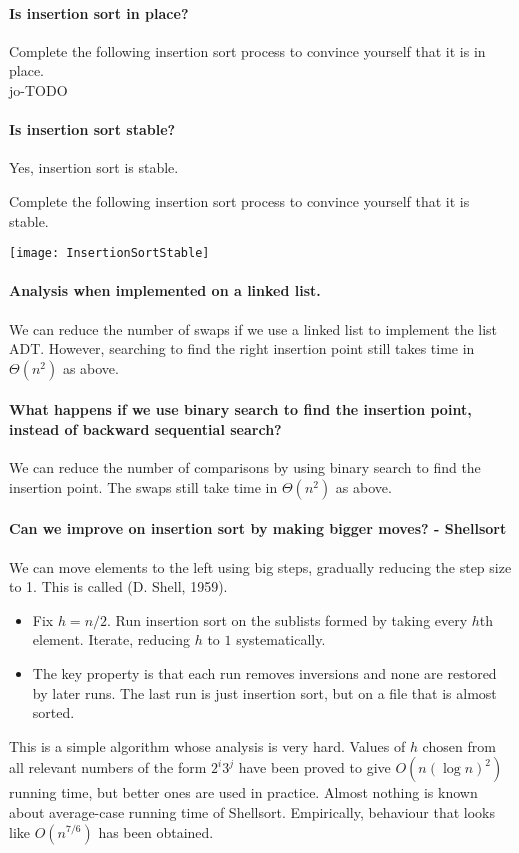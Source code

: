 \paragraph{Is insertion sort in place?}
\begin{Boxample}[0]
Complete the following insertion sort process to convince yourself that it is in place.\\
jo-TODO
\end{Boxample}


\paragraph{Is insertion sort stable?}
Yes, insertion sort is stable.
\begin{Boxample}[0]
Complete the following insertion sort process to convince yourself that it is stable.
\begin{center}
\texttt{[image: InsertionSortStable]} 
\end{center}
\end{Boxample}

\paragraph{Analysis when implemented on a linked list.}
We can reduce the number of swaps if we use a linked list to implement 
the list ADT. However, searching to find the right insertion point still takes time in 
$\Theta(n^2)$ as above.

\paragraph{What happens if we use binary search to find the insertion point, instead of backward sequential search?}
We can reduce the number of comparisons by using binary search to find 
the insertion point. The swaps still take time in $\Theta(n^2)$ as above.

\paragraph{Can we improve on insertion sort by making bigger moves? - Shellsort}
We can move elements to the left using big steps, gradually reducing the 
step size to 1. This is called  (D. Shell, 1959). 
\begin{itemize}
\item Fix $h = n/2$. Run insertion sort on the sublists formed by taking 
every $h$th element. Iterate, reducing $h$ to $1$ systematically. 
\item The key property is that each run removes inversions and none are 
restored by later runs. The last run is just insertion sort, but on a file that 
is almost sorted.
\end{itemize}
This is a simple algorithm whose analysis is very hard. 
Values of $h$ chosen from all relevant numbers of the form $2^i 3^j$ have been proved to give 
$O(n (\log n)^2)$ running time, but better ones are used in practice. 
Almost nothing is known about average-case running time of Shellsort. 
Empirically, behaviour that looks like $O(n^{7/6})$ has been obtained.

